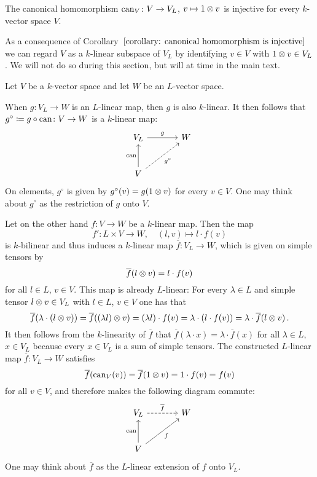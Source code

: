 \begin{corollary}
  \label{corollary: canonical homomorphism is injective}
  The canonical homomorphism $\operatorname{can}_V \colon V \to V_L$, $v \mapsto 1 \mathbin{\otimes} v$ is injective for every $k$-vector space $V$.
\end{corollary}


\begin{fluff}
  As a consequence of Corollary~$\ref{corollary: canonical homomorphism is injective}$ we can regard $V$ as a $k$-linear subspace of $V_L$ by identifying $v \in V$ with $1 \mathbin{\otimes} v \in V_L$.
  We will not do so during this section, but will at time in the main text.
\end{fluff}


\begin{fluff}
  Let $V$ be a $k$-vector space and let $W$ be an $L$-vector space.
  
  When $g \colon V_L \to W$ is an $L$-linear map, then $g$ is also $k$-linear.
  It then follows that $g^\circ \coloneqq g \circ \operatorname{can} \colon V \to W$ is a $k$-linear map:
  \[
    \begin{tikzcd}[sep = large]
        V_L
        \arrow{r}[above]{g}
      & W
      \\
        V
        \arrow{u}[left]{\can}
        \arrow[dashed]{ru}[below right]{g^\circ}
      & {}
    \end{tikzcd}
  \]
  On elements, $g^\circ$ is given by $g^\circ(v) = g(1 \mathbin{\otimes} v)$ for every $v \in V$.
  One may think about $g^\circ$ as the restriction of $g$ onto $V$.
  
  Let on the other hand $f \colon V \to W$ be a $k$-linear map.
  Then the map
  \[
            f'
    \colon  L \times V
    \to     W,
    \quad   (l,v)
    \mapsto l \cdot f(v)
  \]
  is $k$-bilinear and thus induces a $k$-linear map $\overline{f} \colon V_L \to W$, which is given on simple tensors by
  \[
      \overline{f}(l \mathbin{\otimes} v)
    = l \cdot f(v)
  \]
  for all $l \in L$, $v \in V$.
  This map is already $L$-linear:
  For every $\lambda \in L$ and simple tensor $l \mathbin{\otimes} v \in V_L$ with $l \in L$, $v \in V$ one has that
  \[
      \overline{f}(\lambda \cdot (l \mathbin{\otimes} v))
    = \overline{f}( (\lambda l) \mathbin{\otimes} v )
    = (\lambda l) \cdot f(v)
    = \lambda \cdot (l \cdot f(v))
    = \lambda \cdot \overline{f}(l \mathbin{\otimes} v) \,.
  \]
  It then follows from the $k$-linearity of $\overline{f}$ that $\overline{f}(\lambda \cdot x) = \lambda \cdot \overline{f}(x)$ for all $\lambda \in L$, $x \in V_L$ because every $x \in V_L$ is a sum of simple tensors.
  The constructed $L$-linear map $\overline{f} \colon V_L \to W$ satisfies
  \[
      \overline{f}(\operatorname{can}_V(v))
    = \overline{f}(1 \mathbin{\otimes} v)
    = 1 \cdot f(v)
    = f(v)
  \]
  for all $v \in V$, and therefore makes the following diagram commute:
    \[
      \begin{tikzcd}[sep = large]
          V_L
          \arrow[dashed]{r}[above]{\overline{f}}
        & W
        \\
          V
          \arrow{u}[left]{\can}
          \arrow{ru}[below right]{f}
        & {}
      \end{tikzcd}
    \]
  One may think about $\overline{f}$ as the $L$-linear extension of $f$ onto $V_L$.
  

\end{fluff}
